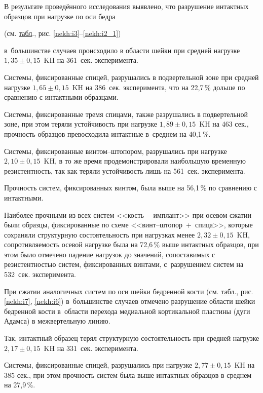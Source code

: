 В результате проведённого исследования выявлено, что разрушение интактных образцов при нагрузке по оси бедра %

(см. \hyperlink{nekh:1}{табл}., рис. \ref{nekh:i3}--\ref{nekh:i2_1}) 

в~большинстве случаев происходило в области шейки при средней нагрузке $1,35\pm0,15$~KH на 361~сек. эксперимента. 

Системы, фиксированные спицей, разрушались в подвертельной зоне при средней нагрузке $1,65\pm0,15$~KH на 386~сек. эксперимента, что на 22,7\,\% дольше по сравнению с интактными образцами. 

Системы, фиксированные тремя спицами, также разрушались в подвертельной зоне, при этом теряли устойчивость при нагрузке $1,89\pm0,15$~KH на 463 сек., прочность образцов превосходила интактные в~среднем на 40,1\,\%. 

Системы, фиксированные винтом–штопором, разрушались при нагрузке $2,10\pm0,15$~KH, в то же время продемонстрировали наибольшую временную резистентность, так как теряли устойчивость лишь на 561~сек. эксперимента. 

Прочность систем, фиксированных винтом, была выше на 56,1\,\% по сравнению с интактными. 

Наиболее прочными из всех систем <<кость~-- имплант>> при осевом сжатии были образцы, фиксированные по схеме <<винт--штопор~+~спица>>, которые сохраняли структурную состоятельность при нагрузках менее $2,32\pm0,15$~KH, сопротивляемость осевой нагрузке была на 72,6\,\% выше интактных образцов, при этом было отмечено падение нагрузок до значений, сопоставимых с резистентностью систем, фиксированных винтами, с~разрушением систем на 532~сек. эксперимента.











При сжатии аналогичных  систем по оси шейки бедренной кости (см. \hyperlink{nekh:2}{табл}., рис. \ref{nekh:i7}, \ref{nekh:i6}) в~большинстве случаев отмечено разрушение области шейки бедренной кости в~области перехода медиальной кортикальной пластины (дуги Адамса) в межвертельную линию. 

Так, интактный образец терял структурную состоятельность при средней нагрузке $2,17\pm0,15$~KH на 331~сек. эксперимента. 

Системы, фиксированные спицей, разрушались при нагрузке  $2,77\pm0,15$~KH на 385 сек., при этом прочность систем была выше интактных образцов в среднем на 27,9\,\%. 

